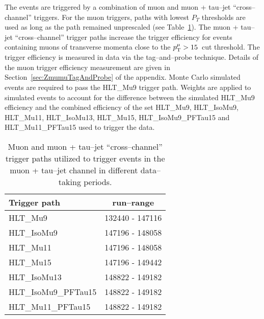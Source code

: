 The events are triggered by a combination of muon and muon + tau--jet
``cross--channel'' triggers. For the muon triggers, paths with lowest $P_{T}$
thresholds are used as long as the path remained unprescaled (see
Table~\ref{tab:AHtoMuTauTriggers}). 
The muon + tau--jet ``cross--channel'' trigger paths increase the trigger efficiency for
events containing muons of transverse momenta close to the
$p_{\mathrm{T}}^{\mu} > 15$~\GeVc cut threshold.
The trigger efficiency is measured in data via the tag--and--probe
technique. Details of the muon trigger efficiency measurement are
given in Section~\ref{sec:ZmumuTagAndProbe} of the appendix.
Monte Carlo simulated events are required to pass the
HLT\_Mu9 trigger path. Weights are applied to simulated events to account for the
difference between the simulated HLT\_Mu9 efficiency and the combined
efficiency of the set HLT\_Mu9, HLT\_IsoMu9, HLT\_Mu11, HLT\_IsoMu13,
HLT\_Mu15, HLT\_IsoMu9\_PFTau15 and HLT\_Mu11\_PFTau15 used to trigger
the data.

\begin{table}[t]
\begin{center}

\begin{tabular}{|l|c|}
\hline
Trigger path & run--range \\
\hline
HLT\_Mu9             & 132440 - 147116 \\
HLT\_IsoMu9          & 147196 - 148058 \\
HLT\_Mu11            & 147196 - 148058 \\
HLT\_Mu15            & 147196 - 149442 \\
HLT\_IsoMu13         & 148822 - 149182 \\
HLT\_IsoMu9\_PFTau15 & 148822 - 149182 \\
HLT\_Mu11\_PFTau15   & 148822 - 149182 \\
\hline
\end{tabular}
\end{center}
\begin{center}
\caption[High Level Trigger paths used to select $\mu + \tau_h$ events]{\captiontext
Muon and muon + tau--jet ``cross--channel'' trigger paths utilized to trigger
events in the muon + tau--jet channel in different data--taking periods.}
\label{tab:AHtoMuTauTriggers}
\end{center}
\end{table}

\ifx\master\undefined\fi
